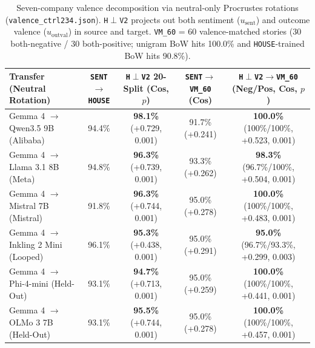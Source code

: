 \documentclass[conference]{IEEEtran}
\begin{document}
\begin{table}[t]
\centering
\caption{Seven-company valence decomposition via neutral-only Procrustes rotations (\texttt{valence\_ctrl234.json}). \texttt{H}$\perp$\texttt{V2} projects out both sentiment ($u_{\text{sent}}$) and outcome valence ($u_{\text{outval}}$) in source and target. \texttt{VM\_60} = 60 valence-matched stories (30 both-negative / 30 both-positive; unigram BoW hits 100.0\% and \texttt{HOUSE}-trained BoW hits 90.8\%).}
\label{tab:val}
\scriptsize
\setlength{\tabcolsep}{3.5pt}
\begin{tabular}{@{}lcccc@{}}
\toprule
\textbf{Transfer (Neutral Rotation)} & \textbf{\texttt{SENT}$\to$\texttt{HOUSE}} & \textbf{\texttt{H}$\perp$\texttt{V2} 20-Split (Cos, $p$)} & \textbf{\texttt{SENT}$\to$\texttt{VM\_60} (Cos)} & \textbf{\texttt{H}$\perp$\texttt{V2}$\to$\texttt{VM\_60} (Neg/Pos, Cos, $p$)} \\
\midrule
Gemma 4 $\to$ Qwen3.5 9B (Alibaba) & 94.4\% & \textbf{98.1\%} (+0.729, 0.001) & 91.7\% (+0.241) & \textbf{100.0\%} (100\%/100\%, +0.523, 0.001) \\
Gemma 4 $\to$ Llama 3.1 8B (Meta) & 94.8\% & \textbf{96.3\%} (+0.739, 0.001) & 93.3\% (+0.262) & \textbf{98.3\%} (96.7\%/100\%, +0.504, 0.001) \\
Gemma 4 $\to$ Mistral 7B (Mistral) & 91.8\% & \textbf{96.3\%} (+0.744, 0.001) & 95.0\% (+0.278) & \textbf{100.0\%} (100\%/100\%, +0.483, 0.001) \\
Gemma 4 $\to$ Inkling 2 Mini (Looped) & 96.1\% & \textbf{95.3\%} (+0.438, 0.001) & 95.0\% (+0.291) & \textbf{95.0\%} (96.7\%/93.3\%, +0.299, 0.003) \\
Gemma 4 $\to$ Phi-4-mini (Held-Out) & 93.1\% & \textbf{94.7\%} (+0.713, 0.001) & 95.0\% (+0.259) & \textbf{100.0\%} (100\%/100\%, +0.441, 0.001) \\
Gemma 4 $\to$ OLMo 3 7B (Held-Out) & 93.1\% & \textbf{95.5\%} (+0.744, 0.001) & 95.0\% (+0.278) & \textbf{100.0\%} (100\%/100\%, +0.457, 0.001) \\
\bottomrule
\end{tabular}
\end{table}
\end{document}
